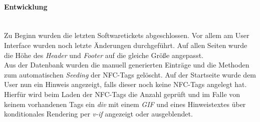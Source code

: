 \documentclass[10pt, a4paper]{article}
\begin{document}
\begin{onehalfspace}
\paragraph*{Entwicklung} $~$ \\
Zu Beginn wurden die letzten Softwaretickets abgeschlossen. Vor allem am User Interface wurden noch letzte Änderungen durchgeführt.
Auf allen Seiten wurde die Höhe des \textit{Header} und \textit{Footer} auf die gleiche Größe angepasst. \\
Aus der Datenbank wurden die manuell generierten Einträge und die Methoden zum automatischen \textit{Seeding} der NFC-Tags gelöscht.
Auf der Startseite wurde dem User nun ein Hinweis angezeigt, falls dieser noch keine NFC-Tags angelegt hat. Hierfür wird beim Laden der NFC-Tags die Anzahl geprüft und im Falle von keinem vorhandenen Tags ein \textit{div} mit einem \textit{GIF} und eines Hinweistextes über konditionales Rendering per \textit{v-if} angezeigt oder ausgeblendet.


\end{onehalfspace}
\end{document}
